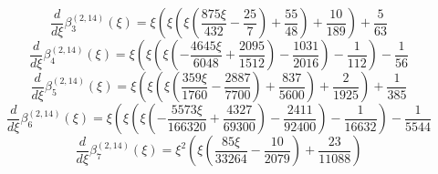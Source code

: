\begin{equation}
\frac{d}{d\xi}\beta_{3}^{(2,14)} (\xi) =
 \xi \left(\xi \left(\xi \left(\frac{875 \xi}{432}
 - \frac{25}{7}\right) + \frac{55}{48}\right) + \frac{10}{189}\right) + \frac{5}{63}
\end{equation}
\begin{equation}
\frac{d}{d\xi}\beta_{4}^{(2,14)} (\xi) =
 \xi \left(\xi \left(\xi \left(- \frac{4645 \xi}{6048}
 + \frac{2095}{1512}\right) - \frac{1031}{2016}\right) - \frac{1}{112}\right) - \frac{1}{56}
\end{equation}
\begin{equation}
\frac{d}{d\xi}\beta_{5}^{(2,14)} (\xi) =
 \xi \left(\xi \left(\xi \left(\frac{359 \xi}{1760}
 - \frac{2887}{7700}\right) + \frac{837}{5600}\right) + \frac{2}{1925}\right) + \frac{1}{385}
\end{equation}
\begin{equation}
\frac{d}{d\xi}\beta_{6}^{(2,14)} (\xi) =
 \xi \left(\xi \left(\xi \left(- \frac{5573 \xi}{166320}
 + \frac{4327}{69300}\right) - \frac{2411}{92400}\right) - \frac{1}{16632}\right) - \frac{1}{5544}
\end{equation}
\begin{equation}
\frac{d}{d\xi}\beta_{7}^{(2,14)} (\xi) =
 \xi^{2} \left(\xi \left(\frac{85 \xi}{33264} - \frac{10}{2079}\right) + \frac{23}{11088}\right)
\end{equation}
